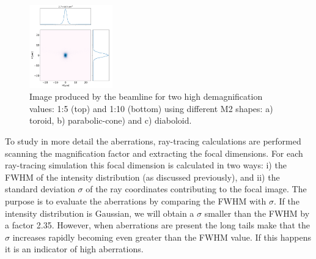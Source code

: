 \documentclass{iucr}              %
\begin{document}
\begin{figure}[h]
\includegraphics[width=0.32\textwidth]{figures/M0p1_diaboloid.png}
\caption{\label{fig:demagnification}
Image produced by the beamline for two high demagnification values: 1:5 (top) and 1:10 (bottom) using different M2 shapes: a) toroid, b) parabolic-cone) and c) diaboloid.}
\end{figure}


To study in more detail the aberrations, ray-tracing calculations are performed scanning the magnification factor and extracting the focal dimensions. For each ray-tracing simulation this focal dimension is calculated in two ways: i) the FWHM of the intensity distribution (as discussed previously), and ii) the standard deviation $\sigma$ of the ray coordinates contributing to the focal image. The purpose is to evaluate the aberrations by comparing the FWHM with $\sigma$. If the intensity distribution is Gaussian, we will obtain a $\sigma$ smaller than the FWHM by a factor 2.35. However, when aberrations are present the long tails make that the $\sigma$ increases rapidly becoming even greater than the FWHM value. If this happens it is an indicator of high aberrations.  
\end{document}
